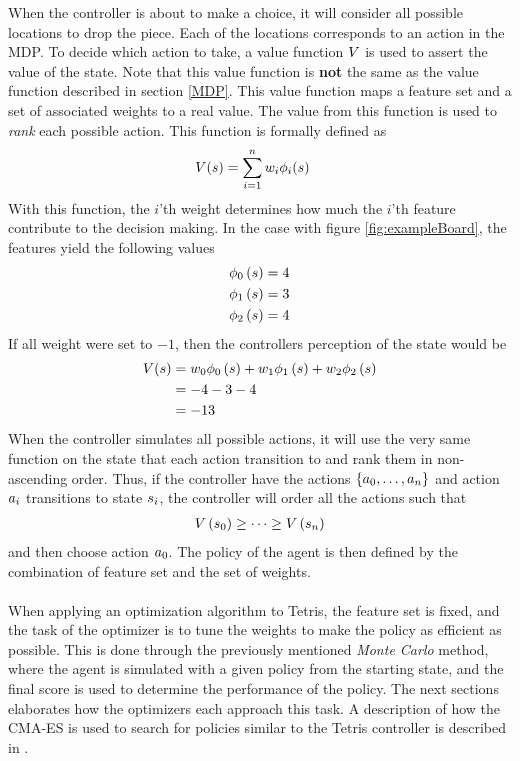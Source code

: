 When the controller is about to make a choice, it will
consider all possible locations to drop the piece. Each
of the locations corresponds to an action in the MDP.
To decide which action to take, a value function $V$
is used to assert the value of the state. Note that 
this value function is \textbf{not} the same as the value 
function described in section \ref{MDP}. This value function
maps a feature set and a set of associated weights to a real value.
The value from this function is used to \textit{rank} each possible action.
This function is formally defined as
\begin{align}
V (s ) &= 
\sum_{i=1}^{n} w _{i}\phi _{i}(s )
\end{align}
With this function, the $i$'th weight determines how
much the $i$'th feature contribute to the decision making.
In the case with figure \ref{fig:exampleBoard}, the features yield
the following values
\begin{align}
\phi_0 \left( s \right) = 4\\
\phi_1 \left( s \right) = 3\\
\phi_2 \left( s \right) = 4
\end{align}
If all weight were set to $-1$, then the controllers perception 
of the state would be
\begin{align}
V (s ) &= 
w_0 \phi_0 \left( s \right) + 
w_1 \phi_1 \left( s \right) + 
w_2 \phi_2 \left( s \right)\\
&= -4 -3 -4\\
&= -13
\end{align}
When the controller simulates all possible actions, it will
use the very same function on the state that each action transition 
to and rank them in non-ascending order. Thus, if the controller
have the actions $\{a_0,\dots,a_n\}$ and action 
$a_i$ transitions to state $s_i$, the controller will
order all the actions such that
\begin{align}
V \left( s_0 \right) \geq \dots \geq 
V \left( s_n \right)
\end{align} 
and then choose action $a_0$. The policy of the agent 
is then defined by the combination of feature set and the set of weights.\\
\\
When applying an optimization algorithm to Tetris, the feature set is 
fixed, and the task of the optimizer is to tune the weights to make the 
policy as efficient as possible. This is done through the previously 
mentioned \textit{Monte Carlo} method, where the agent is simulated
with a given policy from the starting state, and the final score is 
used to determine the performance of the policy. The next sections 
elaborates how the optimizers each approach this task. A description of how
the CMA-ES is used to search for policies similar to the Tetris controller
is described in \citep{igel:03d}.

